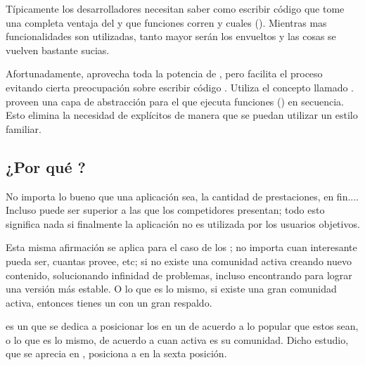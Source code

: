 Típicamente los desarrolladores necesitan saber como escribir código que tome una completa ventaja del \eventloopCPT y que funciones corren \synchronously y cuales \asynchronously (). Mientras mas funcionalidades \asynchronously son utilizadas, tanto mayor serán los \callbacksPL envueltos y las cosas se vuelven bastante sucias.

Afortunadamente, \meteorNAME aprovecha toda la potencia de \eventloopCPT, pero facilita el proceso evitando cierta preocupación sobre escribir código \asynchronousCPT. Utiliza el concepto llamado \fibers \behindthescenes. \fibers proveen una capa de abstracción para el \eventloopCPT que ejecuta funciones \asynchronousCPT(\tasks) en secuencia. Esto elimina la necesidad de \callbacksPL explícitos de manera que se puedan utilizar un estilo \synchronousCPT familiar.

\subsection{¿Por qué \meteorNAME?}

No importa lo bueno que una aplicación sea, la cantidad de prestaciones, en fin....  Incluso puede ser superior a las que los competidores presentan; todo esto significa nada si finalmente la aplicación no es utilizada por los usuarios objetivos.

Esta misma afirmación se aplica para el caso de los \frameworksPC; no importa cuan interesante pueda ser, cuantas \toolsCPT provee, etc; si no existe una comunidad activa creando nuevo contenido, solucionando infinidad de problemas, incluso encontrando \bugsPL para lograr una versión más estable. O lo que es lo mismo, si existe una gran comunidad activa, entonces tienes un \frameworkPC con un gran respaldo.

\hotframeworksNAME es un \websiteINT que se dedica a posicionar los \frameworksPC en un \rankingCPT de acuerdo a lo popular que estos sean, o lo que es lo mismo, de acuerdo a cuan activa es su comunidad. Dicho estudio, que se aprecia en , posiciona a \meteorNAME en la sexta posición.

